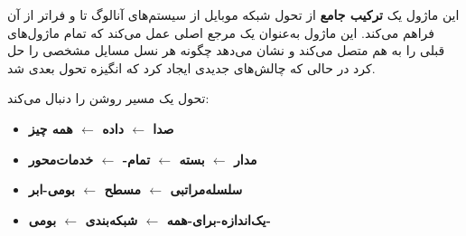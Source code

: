 
این ماژول یک \textbf{ترکیب جامع} از تحول شبکه موبایل از سیستم‌های آنالوگ  تا  و فراتر از آن فراهم می‌کند. این ماژول به‌عنوان یک مرجع اصلی عمل می‌کند که تمام ماژول‌های قبلی را به هم متصل می‌کند و نشان می‌دهد چگونه هر نسل مسایل مشخصی را حل کرد در حالی که چالش‌های جدیدی ایجاد کرد که انگیزه تحول بعدی شد.

تحول یک مسیر روشن را دنبال می‌کند:

\begin{itemize}
\tightlist
\item
  \textbf{صدا \ensuremath{\leftarrow} داده \ensuremath{\leftarrow} همه چیز}
\item
  \textbf{مدار \ensuremath{\leftarrow} بسته \ensuremath{\leftarrow} تمام- \ensuremath{\leftarrow} خدمات‌محور}
\item
  \textbf{سلسله‌مراتبی \ensuremath{\leftarrow} مسطح \ensuremath{\leftarrow} بومی-ابر}
\item
  \textbf{یک‌اندازه-برای-همه \ensuremath{\leftarrow} شبکه‌بندی \ensuremath{\leftarrow} بومی-}
\end{itemize}



